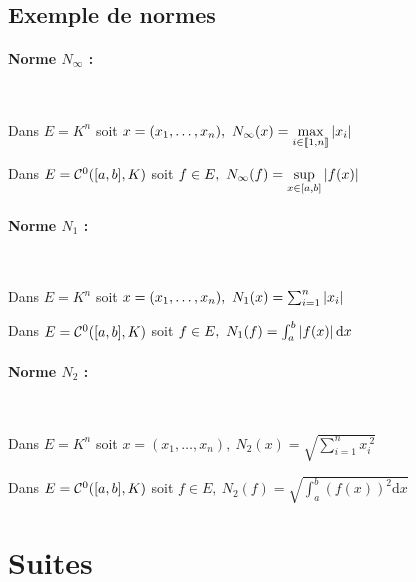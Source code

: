 		 \medskip \\
		

		\medskip
			
	\subsection{Exemple de normes}

		\paragraph{Norme $N_{\infty}$ :}~
		
			Dans $E=K^n$ soit $x=(x_1,\dots ,x_n) ,~ N_{\infty}(x) = 
			\underset{i\in{\llbracket 1,n \rrbracket}}{\mathrm{max}} \left\vert x_i \right\vert$
		
			Dans $E={\mathcal{C}}^0([a,b],K)$ soit $f\in E,~N_{\infty} (f) = \underset{x\in [a,b]}{\mathrm{sup}} \left\vert f(x) \right\vert$
			
		\paragraph{Norme $N_1$ :} ~

			Dans $E=K^n$ soit $x=(x_1,\dots ,x_n) ,~ N_1(x) = \sum_{i=1}^n \left\vert x_i \right\vert $
			
			Dans $E={\mathcal{C}}^0([a,b],K)$ soit $f\in E,~N_1 (f) = \int_a^b \left\vert f(x) \right\vert \mathrm{d}x$
			
		\paragraph{Norme $N_2$ :} ~

			Dans $E=K^n$ soit $x=(x_1,\dots ,x_n) ,~ N_2(x) = \sqrt{\sum_{i=1}^n x_i^{~2}} $
			
			Dans $E={\mathcal{C}}^0([a,b],K)$ soit $f\in E,~N_2 (f) = \sqrt{\int_a^b \left( f(x)\right)^2 \mathrm{d}x}$
		
		\medskip


\section{Suites}
		
